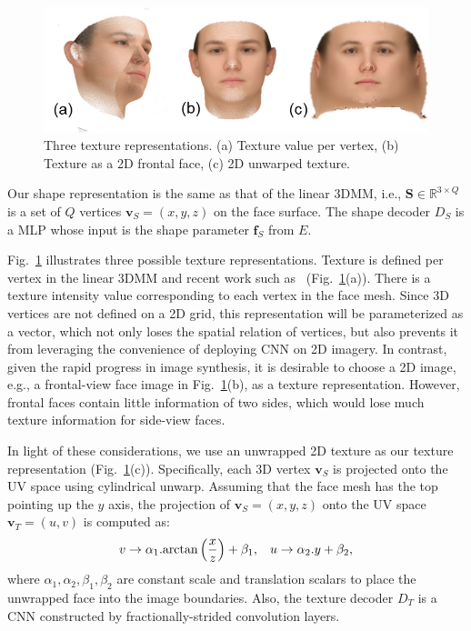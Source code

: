 \begin{figure}[t!]
\centering
\includegraphics[trim=0 0 0 0,clip, width=0.85\linewidth]{img/tex.png}
\vspace{-3mm}
\caption{\small Three texture representations. (a) Texture value per vertex, (b) Texture as a 2D frontal face, (c) 2D unwarped texture.}
\label{fig:tex_representation}
\figvspace 
\end{figure}

Our shape representation is the same as that of the linear 3DMM, i.e., $\mathbf{S}\in\mathbb{R}^{3\times Q}$ is a set of $Q$ vertices $ \mathbf{v}_S = (x,y,z)$ on the face surface. 
%
The shape decoder $D_S$ is a MLP whose input is the shape parameter $\mathbf{f}_S$ from $E$.

Fig.~\ref{fig:tex_representation} illustrates three possible texture representations. %
Texture is defined per vertex in the linear 3DMM and recent work such as~\cite{tewari2017mofa} (Fig.~\ref{fig:tex_representation}(a)). 
There is a texture intensity value corresponding to each vertex in the face mesh. 
%
Since 3D vertices are not defined on a 2D grid, this representation will be parameterized as a vector, which not only loses the spatial relation of vertices, but also prevents it from leveraging the convenience of deploying CNN on 2D imagery.
%
In contrast, given the rapid progress in image synthesis, it is desirable to choose a 2D image, e.g., a frontal-view face image in Fig.~\ref{fig:tex_representation}(b), as a texture representation. 
%
However, frontal faces contain little information of two sides, which would lose much texture information for side-view faces.

In light of these considerations, we use an unwrapped 2D texture as our texture representation (Fig.~\ref{fig:tex_representation}(c)).
Specifically, each 3D vertex $\mathbf{v}_S$  is projected onto the UV space using cylindrical unwarp. 
Assuming that the face mesh has the top pointing up the $y$ axis, the projection of $\mathbf{v}_S = (x, y, z)$ onto the UV space $\mathbf{v}_T = (u, v)$ is computed as:
\begin{equation}
 v \rightarrow \alpha_1 . \text{arctan} \left( \frac{x}{z} \right) + \beta_1, \hspace{3mm} u \rightarrow \alpha_2 . y + \beta_2,
 \label{eqn:unwarp}
\end{equation}
where $\alpha_1, \alpha_2, \beta_1, \beta_2$ are constant scale and translation scalars to place the unwrapped face into the image boundaries.
Also, the texture decoder $D_T$ is a CNN constructed by fractionally-strided convolution layers. 


